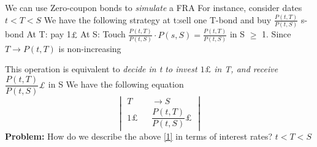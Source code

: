 \begin{rem}
We can use Zero-coupon bonds to \textit{simulate} a FRA
For instance, consider dates $t \lt T \lt S$ 
We have the following strategy at t:sell one T-bond and buy $\frac{P(t,T)}{P(t,S)}$ s-bond
At T: pay 1$\pounds$ 
At S: Touch $\frac{P(t,T)}{P(t,S)}\cdot P(s,S)= \frac{P(t,T)}{P(t,S)}$ in S $\geq$ 1. 
Since $T \to P(t,T)$ is non-increasing
\end{rem}
This operation is equivalent to \textit{decide in t to invest $1 \pounds$ in T, and receive $\dfrac{P(t,T)}{P(t,S)}$\pounds
}in S
We have the following equation
\begin{equation}\label{1}
 \begin{vmatrix}
  T \;&& \rightarrow  S\\
  1 \pounds &&  \dfrac{P(t,T)}{P(t,S)}\pounds
 \end{vmatrix}
\end{equation}
\textbf{Problem:}
How do we describe the above \ref{1} in terms of interest rates?
$t \lt T \lt S$
